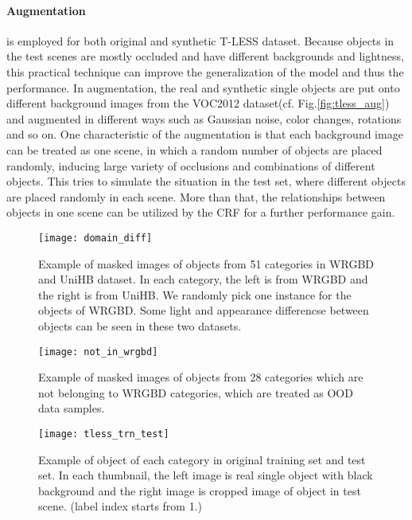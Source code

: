 \paragraph{Augmentation} is employed for both original and synthetic T-LESS dataset.
Because objects in the test scenes are mostly occluded and have different backgrounds and lightness, this practical technique can improve the generalization of the model and thus the performance.
In augmentation, the real and synthetic single objects are put onto different background images from the VOC2012 dataset\cite{pascal-voc-2012}(cf. Fig.\ref{fig:tless_aug}) and augmented in different ways such as Gaussian noise, color changes, rotations and so on.
One characteristic of the augmentation is that each background image can be treated as one scene, in which a random number of objects are placed randomly, inducing large variety of occlusions and combinations of different objects.
This tries to simulate the situation in the test set, where different objects are placed randomly in each scene.
More than that, the relationships between objects in one scene can be utilized by the CRF for a further performance gain.

 \begin{figure}[H]
 	\begin{center}
 		\texttt{[image: domain\_diff]}
 		\caption{Example of masked images of objects from 51 categories in \gls{WRGBD} and UniHB dataset. In each category, the left is from \gls{WRGBD} and the right is from UniHB. We randomly pick one instance for the objects of \gls{WRGBD}. Some light and appearance differencse between objects can be seen in these two datasets.}		
 		\label{fig:wrgbd2}
 	\end{center}
 \end{figure}

\begin{figure}[H]
	\begin{center}
		\texttt{[image: not\_in\_wrgbd]}
		\caption{Example of masked images of objects from 28 categories which are not belonging to \gls{WRGBD} categories, which are treated as \gls{OOD} data samples.}		
		\label{fig:not_in_wrgbd}
	\end{center}
\end{figure} 

\begin{figure}[H]
	\begin{center}
		\texttt{[image: tless\_trn\_test]}
		\caption{Example of object of each category in original training set and test set. In each thumbnail, the left image is real single object with black background and the right image is cropped image of object in test scene. (label index starts from 1.)}		
		\label{fig:tless_ori}
	\end{center}
\end{figure} 

